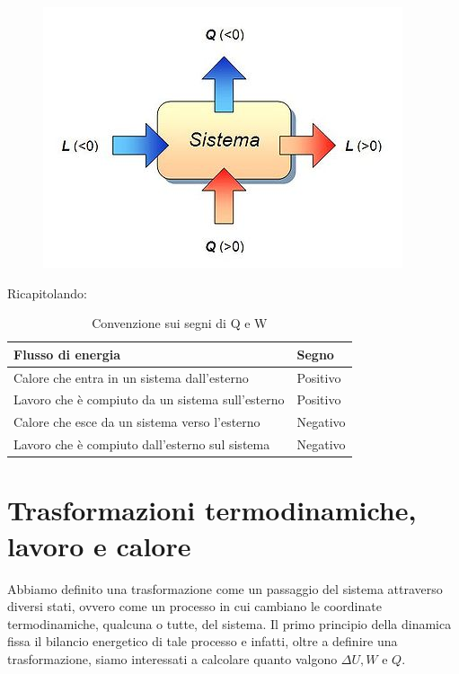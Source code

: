 \documentclass[class=book, crop=false, oneside, 12pt]{standalone}
\begin{document}
\begin{figure}[h]
    \includegraphics[scale=0.8]{termodinamica1}
    \centering
\end{figure}

Ricapitolando:

\begin{table}[]
    \centering
    \begin{tabular}{|l|l|}
    \hline
    \textbf{Flusso di energia}                       & \textbf{Segno} \\ \hline
    Calore che entra in un sistema dall'esterno      & Positivo       \\ \hline
    Lavoro che è compiuto da un sistema sull'esterno & Positivo       \\ \hline
    Calore che esce da un sistema verso l'esterno    & Negativo       \\ \hline
    Lavoro che è compiuto dall'esterno sul sistema   & Negativo       \\ \hline
    \end{tabular}
    \caption{Convenzione sui segni di Q e W}
    \label{tab:convenzione_segni}
\end{table}

\section{Trasformazioni termodinamiche, lavoro e calore}

Abbiamo definito una trasformazione come un passaggio del sistema attraverso diversi stati, ovvero come un processo in cui cambiano le coordinate termodinamiche, qualcuna o tutte, del sistema.
Il primo principio della dinamica fissa il bilancio energetico di tale processo e infatti, oltre a definire una trasformazione, siamo interessati a calcolare quanto valgono \(\Delta U, W\) e \(Q\). 
\end{document}

